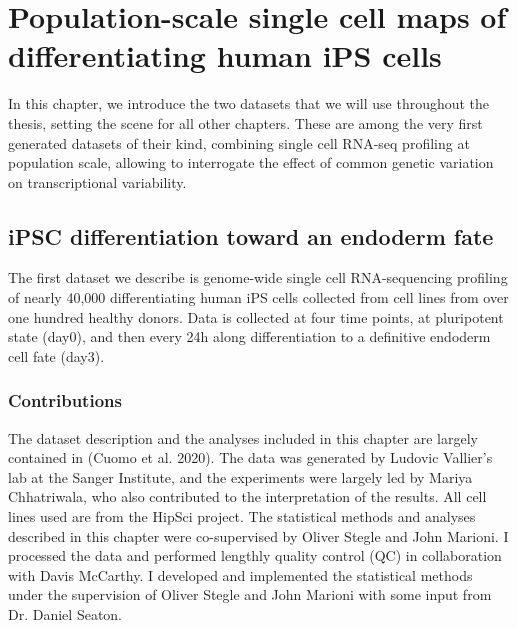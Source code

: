 
\chapter{Population-scale single cell maps of differentiating human iPS cells}

In this chapter, we introduce the two datasets that we will use throughout the thesis, setting the scene for all other chapters. 
These are among the very first generated datasets of their kind, combining single cell RNA-seq profiling at population scale, allowing to interrogate the effect of common genetic variation on transcriptional variability.

\section{iPSC differentiation toward an endoderm fate}

The first dataset we describe is genome-wide single cell RNA-sequencing profiling of nearly 40,000 differentiating human iPS cells collected from cell lines from over one hundred healthy donors. 
Data is collected at four time points, at pluripotent state (day0), and then every 24h along differentiation to a definitive endoderm cell fate (day3).


\subsection{Contributions}

The dataset description and the analyses included in this chapter are largely contained in (Cuomo et al. 2020). The data was generated by Ludovic Vallier’s lab at the Sanger Institute, and the experiments were largely led by Mariya Chhatriwala, who also contributed to the interpretation of the results. 
All cell lines used are from the HipSci project.
The statistical methods and analyses described in this chapter were co-supervised by Oliver Stegle and John Marioni. 
I processed the data and performed lengthly quality control (QC) in collaboration with Davis McCarthy. 
I developed and implemented the statistical methods under the supervision of Oliver Stegle and John Marioni with some input from Dr. Daniel  Seaton.\\

